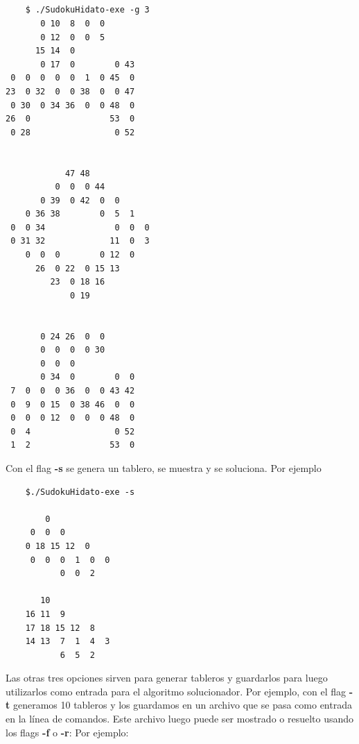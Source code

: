 \documentclass[a4paper, 12pt]{article}
\begin{document}
\begin{verbatim}




    $ ./SudokuHidato-exe -g 3
       0 10  8  0  0      
       0 12  0  0  5      
      15 14  0            
       0 17  0        0 43
 0  0  0  0  0  1  0 45  0
23  0 32  0  0 38  0  0 47
 0 30  0 34 36  0  0 48  0
26  0                53  0
 0 28                 0 52


            47 48            
          0  0  0 44         
       0 39  0 42  0  0      
    0 36 38        0  5  1   
 0  0 34              0  0  0
 0 31 32             11  0  3
    0  0  0        0 12  0   
      26  0 22  0 15 13      
         23  0 18 16         
             0 19            


       0 24 26  0  0      
       0  0  0  0 30      
       0  0  0            
       0 34  0        0  0
 7  0  0  0 36  0  0 43 42
 0  9  0 15  0 38 46  0  0
 0  0  0 12  0  0  0 48  0
 0  4                 0 52
 1  2                53  0
\end{verbatim}

Con el flag \textbf{-s} se genera un tablero, se muestra y se soluciona. Por ejemplo

\begin{verbatim}
    $./SudokuHidato-exe -s

        0            
     0  0  0         
    0 18 15 12  0      
     0  0  0  1  0  0
           0  0  2   

       10            
    16 11  9         
    17 18 15 12  8      
    14 13  7  1  4  3
           6  5  2     
\end{verbatim}
Las otras tres opciones sirven para generar tableros y guardarlos para luego utilizarlos como
entrada para el algoritmo solucionador. Por ejemplo, con el flag \textbf{-t} generamos 10 tableros
y los guardamos en un archivo que se pasa como entrada en la l\'inea de comandos. Este archivo luego
puede ser mostrado o resuelto usando los flags \textbf{-f } o \textbf{-r}: Por ejemplo:
\end{document}
